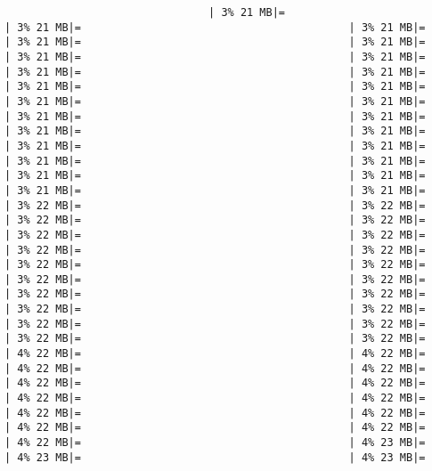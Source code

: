 \documentclass[
]{article}
\begin{document}
\begin{verbatim}
                                | 3% 21 MB|=                                          | 3% 21 MB|=                                          | 3% 21 MB|=                                          | 3% 21 MB|=                                          | 3% 21 MB|=                                          | 3% 21 MB|=                                          | 3% 21 MB|=                                          | 3% 21 MB|=                                          | 3% 21 MB|=                                          | 3% 21 MB|=                                          | 3% 21 MB|=                                          | 3% 21 MB|=                                          | 3% 21 MB|=                                          | 3% 21 MB|=                                          | 3% 21 MB|=                                          | 3% 21 MB|=                                          | 3% 21 MB|=                                          | 3% 21 MB|=                                          | 3% 21 MB|=                                          | 3% 21 MB|=                                          | 3% 21 MB|=                                          | 3% 21 MB|=                                          | 3% 21 MB|=                                          | 3% 21 MB|=                                          | 3% 21 MB|=                                          | 3% 22 MB|=                                          | 3% 22 MB|=                                          | 3% 22 MB|=                                          | 3% 22 MB|=                                          | 3% 22 MB|=                                          | 3% 22 MB|=                                          | 3% 22 MB|=                                          | 3% 22 MB|=                                          | 3% 22 MB|=                                          | 3% 22 MB|=                                          | 3% 22 MB|=                                          | 3% 22 MB|=                                          | 3% 22 MB|=                                          | 3% 22 MB|=                                          | 3% 22 MB|=                                          | 3% 22 MB|=                                          | 3% 22 MB|=                                          | 3% 22 MB|=                                          | 3% 22 MB|=                                          | 3% 22 MB|=                                          | 4% 22 MB|=                                          | 4% 22 MB|=                                          | 4% 22 MB|=                                          | 4% 22 MB|=                                          | 4% 22 MB|=                                          | 4% 22 MB|=                                          | 4% 22 MB|=                                          | 4% 22 MB|=                                          | 4% 22 MB|=                                          | 4% 22 MB|=                                          | 4% 22 MB|=                                          | 4% 22 MB|=                                          | 4% 22 MB|=                                          | 4% 23 MB|=                                          | 4% 23 MB|=                                          | 4% 23 MB|=                                   
\end{verbatim}
\end{document}

